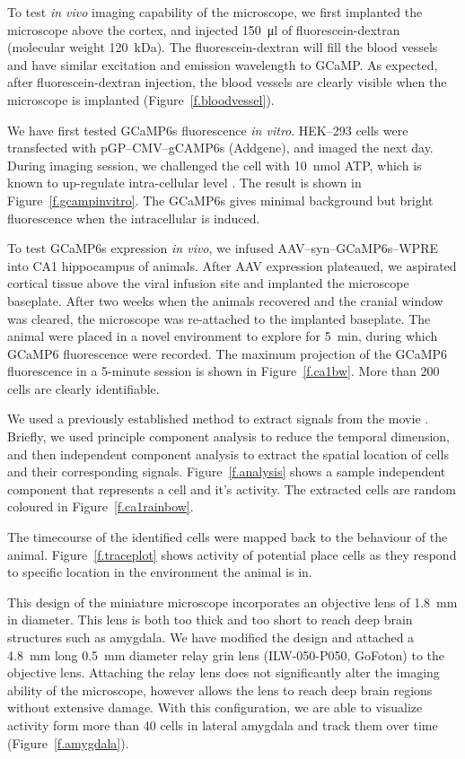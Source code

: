 To test \textit{in vivo} imaging capability of the microscope, we first implanted the microscope above the cortex, and injected \SI{150}{\ul} of fluorescein-dextran (molecular weight \SI{120}{\kilo\dalton}). The fluorescein-dextran will fill the blood vessels and have similar excitation and emission wavelength to GCaMP. As expected, after fluorescein-dextran injection, the blood vessels are clearly visible when the microscope is implanted (Figure~\ref{f.bloodvessel}).

We have first tested GCaMP6s fluorescence \textit{in vitro}. HEK--293 cells were transfected with pGP--CMV--gCAMP6s (Addgene), and imaged the next day. During imaging session, we challenged the cell with \SI{10}{\nmol} ATP, which is known to up-regulate intra-cellular  level \citep[\textit{e.g.}][]{lee04}. The result is shown in Figure~\ref{f.gcampinvitro}. The GCaMP6s gives minimal background but bright fluorescence when the intracellular  is induced.
    
To test GCaMP6s expression \textit{in vivo}, we infused AAV--syn--GCaMP6s--WPRE into CA1 hippocampus of animals. After AAV expression plateaued, we aspirated cortical tissue above the viral infusion site and implanted the microscope baseplate. After two weeks when the animals recovered and the cranial window was cleared, the microscope was re-attached to the implanted baseplate. The animal were placed in a novel environment to explore for \SI{5}{\minute}, during which GCaMP6 fluorescence were recorded. The maximum projection of the GCaMP6 fluorescence in a 5-minute session is shown in Figure~\ref{f.ca1bw}. More than 200 cells are clearly identifiable.

We used a previously established method to extract  signals from the movie \citep{mukamel09}. Briefly, we used principle component analysis to reduce the temporal dimension, and then independent component analysis to extract the spatial location of cells and their corresponding  signals. Figure~\ref{f.analysis} shows a sample independent component that represents a cell and it's activity. The extracted cells are random coloured in Figure~\ref{f.ca1rainbow}.   

The timecourse of the identified cells were mapped back to the behaviour of the animal. Figure~\ref{f.traceplot} shows  activity of potential place cells as they respond to specific location in the environment the animal is in.

This design of the miniature microscope incorporates an objective lens of \SI{1.8}{\mm} in diameter. This lens is both too thick and too short to reach deep brain structures such as amygdala. We have modified the design and attached a \SI{4.8}{\mm} long \SI{0.5}{\mm} diameter relay \gls{grin} lens (ILW-050-P050, GoFoton) to the objective lens. Attaching the relay lens does not significantly alter the imaging ability of the microscope, however allows the lens to reach deep brain regions without extensive damage. With this configuration, we are able to visualize activity form more than 40 cells in lateral amygdala and track them over time (Figure~\ref{f.amygdala}).


